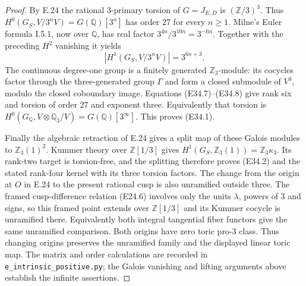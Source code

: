 \begin{proof}
By E.24 the rational $3$-primary torsion of $G=J_{E,D}$ is
$(\mathbb Z/3)^3$. Thus
$H^0(G_S,V/3^nV)=G(\mathbb Q)[3^n]$ has order $27$
for every $n\ge1$.
Milne's Euler formula I.5.1, now over $\mathbb Q$, has
real factor $3^{4n}/3^{10n}=3^{-6n}$.
Together with the preceding $H^2$ vanishing it yields
\[
 |H^1(G_S,V/3^nV)|=3^{6n+3}.
 \tag{E34.8}
\]
The continuous degree-one group is a finitely generated
$\mathbb Z_3$-module: its cocycles factor through the
three-generated group $\Gamma$ and form a closed
submodule of $V^3$, modulo the closed coboundary image.
Equations (E34.7)--(E34.8) give rank six and torsion of
order $27$ and exponent three. Equivalently that torsion is
$H^0(G_{\mathbb Q},V\otimes\mathbb Q_3/V)
=G(\mathbb Q)[3^\infty]$.
This proves (E34.1).

Finally the algebraic retraction of E.24 gives a split map
of these Galois modules to $\mathbb Z_3(1)^2$.
Kummer theory over $\mathbb Z[1/3]$ gives
$H^1(G_S,\mathbb Z_3(1))=\mathbb Z_3\kappa_3$.
Its rank-two target is torsion-free, and the splitting
therefore proves (E34.2) and the stated rank-four kernel
with its three torsion factors.
The change from the origin at $O$ in E.24 to the present
rational cusp is also unramified outside three. The framed
cusp-difference relation (E24.6) involves only the units
$\lambda$, powers of $3$ and signs, so this framed point
extends over $\mathbb Z[1/3]$ and its Kummer cocycle is
unramified there. Equivalently both integral tangential
fiber functors give the same unramified comparison.
Both origins have zero toric pro-$3$ class.
Thus changing origins preserves the unramified family
and the displayed linear toric map.
The matrix and order calculations are recorded in
\texttt{e\_intrinsic\_positive.py}; the Galois vanishing
and lifting arguments above establish the infinite assertions.
\end{proof}
